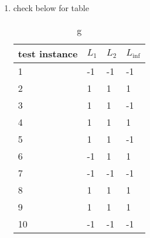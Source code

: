 \documentclass[12pt]{article}
\begin{document}
\begin{enumerate}
\begin{enumerate}
        \item check below for table
        \begin{table}[]
        \caption {g} 
        \begin{tabular}{|l|l|l|l|}
        \hline
        test instance & $L_1$ & $L_2$ & $L_\inf$ \\ \hline
        1             & -1    & -1    & -1       \\ \hline
        2             & 1     & 1     & 1        \\ \hline
        3             & 1     & 1     & -1       \\ \hline
        4             & 1     & 1     & 1        \\ \hline
        5             & 1     & 1     & -1       \\ \hline
        6             & -1    & 1     & 1        \\ \hline
        7             & -1    & -1    & -1       \\ \hline
        8             & 1     & 1     & 1        \\ \hline
        9             & 1     & 1     & 1        \\ \hline
        10            & -1    & -1    & -1       \\ \hline
        \end{tabular}
        \end{table}
        

    \end{enumerate}
    
    
\end{enumerate}
    
\end{document}
